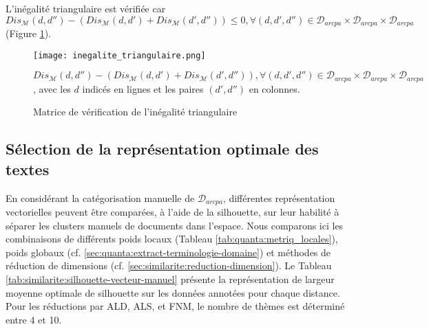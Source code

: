 L'inégalité triangulaire est vérifiée car $Dis_\mathcal{M}(d,d'') - (Dis_\mathcal{M}(d,d') + Dis_\mathcal{M}(d',d'')) \leq 0, \forall (
d,d',d'') \in \mathcal{D}_{arcpa} \times \mathcal{D}_{arcpa} \times \mathcal{D}_{arcpa}$ (Figure \ref{fig:similarite:matrice_inegalite_triangulaire}).

\begin{figure}[!htb]
	\centering \texttt{[image: inegalite\_triangulaire.png]}
	
	\scriptsize{$Dis_\mathcal{M}(d,d'') - (Dis_\mathcal{M}(d,d') + Dis_\mathcal{M}(d',d'')), \forall (d,d',d'') \in \mathcal{D}_{arcpa} \times \mathcal{D}_{arcpa} \times \mathcal{D}_{arcpa}$, avec les $d$ indicés en lignes et les paires $(d',d'')$ en colonnes.}
	\caption{Matrice de vérification de l'inégalité triangulaire}\label{fig:similarite:matrice_inegalite_triangulaire}
\end{figure}
 

\subsection{Sélection de la représentation optimale des textes}
\label{sec:similarite:select-repr-optimal}
En considérant la catégorisation manuelle de $\mathcal{D}_{arcpa}$, différentes représentation vectorielles peuvent être comparées, à l'aide de la silhouette, sur leur habilité à séparer les clusters manuels de documents dans l'espace. Nous comparons ici les combinaisons de différents poids locaux (Tableau \ref{tab:quanta:metriq_locales}), poids globaux (cf. \ref{sec:quanta:extract-terminologie-domaine}) et méthodes de réduction de dimensions (cf. \ref{sec:similarite:reduction-dimension}). 
Le Tableau \ref{tab:similarite:silhouette-vecteur-manuel} présente la représentation de largeur moyenne optimale de silhouette sur les données annotées pour chaque distance. Pour les réductions par ALD, ALS, et FNM, le nombre de thèmes est déterminé entre 4 et 10.

